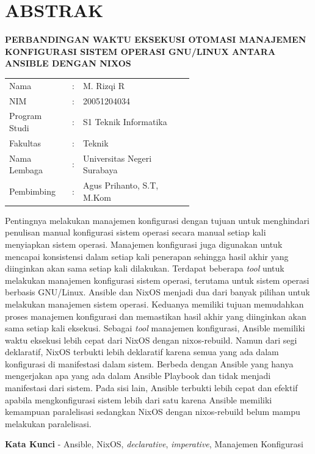 \documentclass[10pt,twoside]{report}
\begin{document}
\chapter*{ABSTRAK}
\begin{adjustwidth}{0.0cm}{}
	\begin{center}
		\textbf{PERBANDINGAN WAKTU EKSEKUSI OTOMASI MANAJEMEN KONFIGURASI SISTEM OPERASI GNU/LINUX ANTARA ANSIBLE DENGAN NIXOS}
	\end{center}
	\medskip
	\begin{adjustwidth}{0.0cm}{}
		\begin{tabular}{@{}lcp{0.6\linewidth}}
			Nama          & : & M. Rizqi R                  \\
			NIM           & : & 20051204034                 \\
			Program Studi & : & S1 Teknik Informatika       \\
			Fakultas      & : & Teknik                      \\
			Nama Lembaga  & : & Universitas Negeri Surabaya \\
			Pembimbing    & : & Agus Prihanto, S.T, M.Kom   \\
		\end{tabular}
	\end{adjustwidth}
	\medskip

	Pentingnya melakukan manajemen konfigurasi dengan tujuan untuk menghindari
	penulisan manual konfigurasi sistem operasi secara manual setiap kali
	menyiapkan sistem operasi. Manajemen konfigurasi juga digunakan untuk
	mencapai konsistensi dalam setiap kali penerapan sehingga hasil akhir yang
	diinginkan akan sama setiap kali dilakukan. Terdapat beberapa \textit{tool}
	untuk melakukan manajemen konfigurasi sistem operasi, terutama untuk sistem
	operasi berbasis GNU/Linux. Ansible dan NixOS menjadi dua dari banyak pilihan
	untuk melakukan manajemen sistem operasi. Keduanya memiliki tujuan memudahkan
	proses manajemen konfigurasi dan memastikan hasil akhir yang diinginkan akan
	sama setiap kali eksekusi. Sebagai \textit{tool} manajemen konfigurasi,
	Ansible memiliki waktu eksekusi lebih cepat dari NixOS dengan nixos-rebuild.
	Namun dari segi deklaratif, NixOS terbukti lebih deklaratif karena semua yang
	ada dalam konfigurasi di manifestasi dalam sistem. Berbeda dengan Ansible
	yang hanya mengerjakan apa yang ada dalam Ansible Playbook dan tidak menjadi
	manifestasi dari sistem. Pada sisi lain, Ansible terbukti lebih cepat dan
	efektif apabila mengkonfigurasi sistem lebih dari satu karena Ansible memiliki
	kemampuan paralelisasi sedangkan NixOS dengan nixos-rebuild belum mampu
	melakukan paralelisasi.
	\medskip

	\noindent\textbf{Kata Kunci} - Ansible, NixOS, \textit{declarative}, \textit{imperative},
	Manajemen Konfigurasi
\end{adjustwidth}
\newpage
\end{document}
